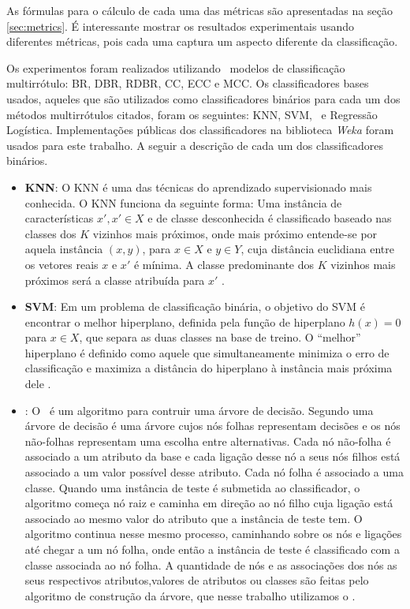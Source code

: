 As fórmulas para o cálculo de cada uma das métricas são apresentadas na seção \ref{sec:metrics}.
É interessante mostrar os resultados experimentais usando diferentes métricas, pois cada uma captura
um aspecto diferente da classificação. 

Os experimentos foram realizados utilizando \Nml~modelos de classificação multirrótulo: BR, DBR, RDBR, CC, ECC e MCC.
Os classificadores bases usados, aqueles que são utilizados como classificadores binários para
cada um dos métodos multirrótulos citados, foram os seguintes:
KNN, SVM, \jqo~e Regressão Logística.
Implementações públicas dos classificadores na biblioteca \textit{Weka} \cite{weka} foram usados para este trabalho.
A seguir a descrição de cada um dos classificadores binários.

\begin{itemize}
 \item \textbf{KNN}: O KNN é uma das técnicas do aprendizado supervisionado mais conhecida. 
 O KNN funciona da seguinte forma: Uma instância de características $x',x'\in X$
 e de classe desconhecida é classificado baseado
 nas classes dos $K$ vizinhos mais próximos, onde mais próximo entende-se por aquela instância
 $(x,y)$, para $x \in X$ e $y \in Y$,
 cuja distância euclidiana entre os vetores reais $x$ e $x'$ é mínima. 
 A classe predominante dos $K$ vizinhos mais próximos será a classe atribuída para $x'$ \cite{topalgos2008}.
 
 \item \textbf{SVM}: 
 Em um problema de classificação binária, o objetivo do SVM é encontrar o melhor hiperplano, 
 definida pela função de hiperplano $h(x)=0$ para $x \in X$,
 que separa as duas classes na base de treino.
 O ``melhor'' hiperplano é definido como aquele que simultaneamente minimiza
 o erro de classificação e maximiza a distância do hiperplano à instância mais próxima dele \cite{topalgos2008}. 
 
 \item \textbf{\jqo}: 
 O \jqo~é um algoritmo para contruir uma árvore de decisão.
 Segundo \cite{peng2009implementation} uma árvore de decisão é uma
 árvore cujos nós folhas representam decisões e os nós não-folhas representam
 uma escolha entre alternativas. Cada nó não-folha é associado a um atributo da base e
 cada ligação desse nó a seus nós filhos está associado a um valor possível desse atributo.
 Cada nó folha é associado a uma classe.
 Quando uma instância de teste é submetida ao classificador, o algoritmo começa nó raiz e caminha
 em direção ao nó filho cuja ligação está associado ao mesmo valor do atributo que a instância de teste tem.
 O algoritmo continua nesse mesmo processo, caminhando sobre os nós e ligações até chegar a um nó folha, onde então
 a instância de teste é classificado com a classe associada ao nó folha.
 A quantidade de nós e as associações dos nós as seus respectivos atributos,valores de atributos ou classes
 são feitas pelo algoritmo
 de construção da árvore, que nesse trabalho utilizamos o \jqo.


\end{itemize}
